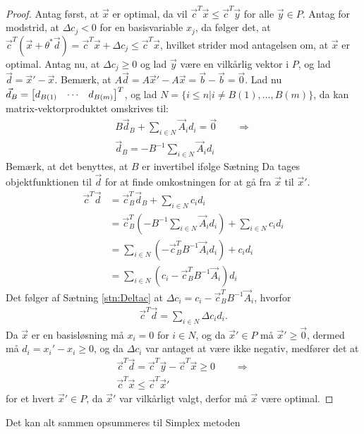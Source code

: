 \begin{proof}
Antag først, at $\vec{x}$ er optimal, da vil $\vec{c}^T\vec{x} \leq \vec{c}^T\vec{y}$ for alle $\vec{y} \in P$. 
Antag for modstrid, at $\Delta c_j < 0$ for en basisvariable $x_j$, da følger det, at $\vec{c}^T(\vec{x}+\theta^*\vec{d}) = \vec{c}^T\vec{x} + \Delta c_j \leq \vec{c}^T\vec{x}$, hvilket strider mod antagelsen om, at $\vec{x}$ er optimal.
Antag nu, at $\Delta c_j \geq 0$ og lad $\vec{y}$ være en vilkårlig vektor i $P$, og lad $\vec{d}=\vec{x}'-\vec{x}$.
Bemærk, at $A\vec{d} = A\vec{x}'- A\vec{x} =  \vec{b} - \vec{b} =\vec{0}$.
Lad nu $\vec{d}_B = \begin{bmatrix} d_{B(1)} & \cdots & d_{B(m)} \end{bmatrix}^T$, og lad $N= \{i \leq n| i \neq B(1),...,B(m)\}$, da kan matrix-vektorproduktet omskrives til:
\begin{align*}
	B\vec{d}_B + \sum_{i \in N} \vec{A}_i d_i = \vec{0} \qquad \Rightarrow
	\\ \vec{d}_B = - B^{-1}\sum_{i \in N} \vec{A}_i d_i
\end{align*}
Bemærk, at det benyttes, at $B$ er invertibel ifølge Sætning %
Da tages objektfunktionen til $\vec{d}$ for at finde omkostningen for at gå fra $\vec{x}$ til $\vec{x}'$.
\begin{align*}
 \vec{c}^T\vec{d} &= \vec{c}_B^T\vec{d}_B + \sum_{i \in N} c_i d_i 
 \\&= \vec{c}_B^T(- B^{-1}\sum_{i \in N} \vec{A}_i d_i) + \sum_{i \in N} c_i d_i  
 \\&= \sum_{i \in N} (- \vec{c}_B^T B^{-1} \vec{A}_i d_i) +  c_i d_i 
 \\&= \sum_{i \in N} ( c_i - \vec{c}_B^TB^{-1}\vec{A}_i ) d_i
\end{align*}
Det følger af Sætning \ref{stn:Deltac} at $\Delta c_i = c_i - \vec{c}_B^TB^{-1}\vec{A}_i $, hvorfor
\begin{align*}
\vec{c}^T\vec{d} = \sum_{i \in N} \Delta c_i d_i.
\end{align*}
Da $\vec{x}$ er en basisløsning må $x_i = 0$ for $i \in N$, og da $\vec{x}' \in P$ må $\vec{x}' \geq \vec{0}$, dermed må $d_i = x_i' - x_i \geq 0$, og da $\Delta c_i$ var antaget at være ikke negativ, medfører det at
\begin{align*}
\vec{c}^T\vec{d} = \vec{c}^T\vec{y}-\vec{c}^T\vec{x} \geq 0 \qquad \Rightarrow
\\ \vec{c}^T\vec{x} \leq \vec{c}^T\vec{x}'
\end{align*}
for et hvert $\vec{x}' \in P$, da $\vec{x}'$ var vilkårligt valgt, derfor må $\vec{x}$ være optimal.
\end{proof}
Det kan alt sammen opsummeres til Simplex metoden

